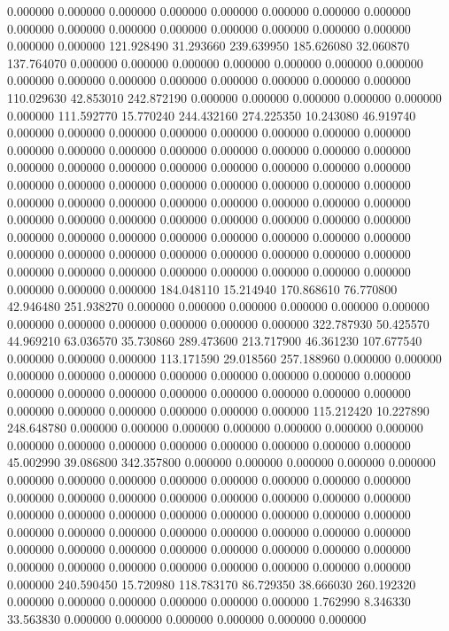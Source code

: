 0.000000 0.000000 0.000000
0.000000 0.000000 0.000000
0.000000 0.000000 0.000000
0.000000 0.000000 0.000000
0.000000 0.000000 0.000000
0.000000 0.000000 0.000000
121.928490 31.293660 239.639950
185.626080 32.060870 137.764070
0.000000 0.000000 0.000000
0.000000 0.000000 0.000000
0.000000 0.000000 0.000000
0.000000 0.000000 0.000000
0.000000 0.000000 0.000000
110.029630 42.853010 242.872190
0.000000 0.000000 0.000000
0.000000 0.000000 0.000000
111.592770 15.770240 244.432160
274.225350 10.243080 46.919740
0.000000 0.000000 0.000000
0.000000 0.000000 0.000000
0.000000 0.000000 0.000000
0.000000 0.000000 0.000000
0.000000 0.000000 0.000000
0.000000 0.000000 0.000000
0.000000 0.000000 0.000000
0.000000 0.000000 0.000000
0.000000 0.000000 0.000000
0.000000 0.000000 0.000000
0.000000 0.000000 0.000000
0.000000 0.000000 0.000000
0.000000 0.000000 0.000000
0.000000 0.000000 0.000000
0.000000 0.000000 0.000000
0.000000 0.000000 0.000000
0.000000 0.000000 0.000000
0.000000 0.000000 0.000000
0.000000 0.000000 0.000000
0.000000 0.000000 0.000000
0.000000 0.000000 0.000000
0.000000 0.000000 0.000000
0.000000 0.000000 0.000000
0.000000 0.000000 0.000000
0.000000 0.000000 0.000000
184.048110 15.214940 170.868610
76.770800 42.946480 251.938270
0.000000 0.000000 0.000000
0.000000 0.000000 0.000000
0.000000 0.000000 0.000000
0.000000 0.000000 0.000000
322.787930 50.425570 44.969210
63.036570 35.730860 289.473600
213.717900 46.361230 107.677540
0.000000 0.000000 0.000000
113.171590 29.018560 257.188960
0.000000 0.000000 0.000000
0.000000 0.000000 0.000000
0.000000 0.000000 0.000000
0.000000 0.000000 0.000000
0.000000 0.000000 0.000000
0.000000 0.000000 0.000000
0.000000 0.000000 0.000000
0.000000 0.000000 0.000000
115.212420 10.227890 248.648780
0.000000 0.000000 0.000000
0.000000 0.000000 0.000000
0.000000 0.000000 0.000000
0.000000 0.000000 0.000000
0.000000 0.000000 0.000000
45.002990 39.086800 342.357800
0.000000 0.000000 0.000000
0.000000 0.000000 0.000000
0.000000 0.000000 0.000000
0.000000 0.000000 0.000000
0.000000 0.000000 0.000000
0.000000 0.000000 0.000000
0.000000 0.000000 0.000000
0.000000 0.000000 0.000000
0.000000 0.000000 0.000000
0.000000 0.000000 0.000000
0.000000 0.000000 0.000000
0.000000 0.000000 0.000000
0.000000 0.000000 0.000000
0.000000 0.000000 0.000000
0.000000 0.000000 0.000000
0.000000 0.000000 0.000000
0.000000 0.000000 0.000000
0.000000 0.000000 0.000000
240.590450 15.720980 118.783170
86.729350 38.666030 260.192320
0.000000 0.000000 0.000000
0.000000 0.000000 0.000000
1.762990 8.346330 33.563830
0.000000 0.000000 0.000000
0.000000 0.000000 0.000000
